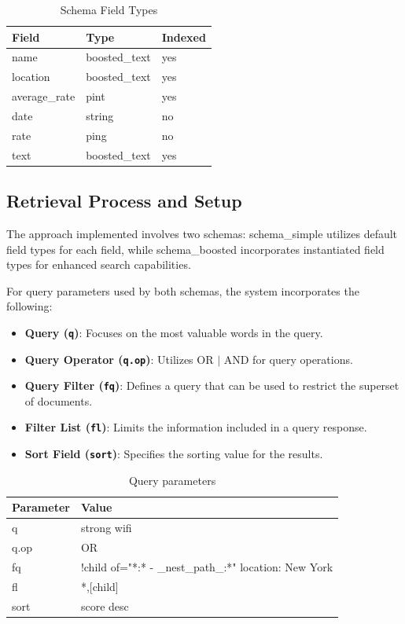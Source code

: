 \documentclass[sigconf]{acmart}
\begin{document}
\begin{table}[h]
\caption{Schema Field Types}
\label{tab:schema_types}
\begin{tabular}{lll}
\toprule
Field & Type & Indexed\\
\midrule
name & boosted\_text & yes\\
location & boosted\_text & yes\\
average\_rate & pint & yes\\
date & string & no \\
rate & ping & no \\
text & boosted\_text & yes \\
\bottomrule
\end{tabular}
\end{table}

\subsection{Retrieval Process and Setup}

The approach implemented involves two schemas: schema\_simple utilizes default field types for each field, while schema\_boosted incorporates instantiated field types for enhanced search capabilities. 

For query parameters used by both schemas, the system incorporates the following:
\begin{itemize}
    \item \textbf{Query (\texttt{q})}: Focuses on the most valuable words in the query.
    \item \textbf{Query Operator (\texttt{q.op})}: Utilizes OR $|$ AND for query operations.
    \item \textbf{Query Filter (\texttt{fq})}: Defines a query that can be used to restrict the superset of documents.
    \item \textbf{Filter List (\texttt{fl})}: Limits the information included in a query response.
    \item \textbf{Sort Field (\texttt{sort})}: Specifies the sorting value for the results.
\end{itemize}

\begin{table}[h]
\caption{Query parameters}
\label{tab:query_params}
\begin{tabular}{ll}
\toprule
Parameter & Value\\
\midrule
q & strong wifi  \\
q.op & OR \\
fq & {!child of="*:* - \_nest\_path\_:*"} location: New York \\
fl & *,[child] \\
sort & score desc \\
\bottomrule
\end{tabular}
\end{table}
\end{document}
